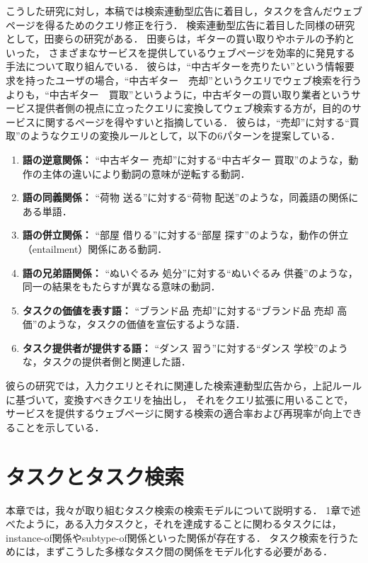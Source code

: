 \documentclass[submit,techreq]{ipsj}
\begin{document}
こうした研究に対し，本稿では検索連動型広告に着目し，タスクを含んだウェブページを得るためのクエリ修正を行う．
検索連動型広告に着目した同様の研究として，田麥らの研究がある\cite{tamugiDEIM}\cite{tamugiDBS}\cite{tamugiMS}．
田麥らは，ギターの買い取りやホテルの予約といった，
さまざまなサービスを提供しているウェブページを効率的に発見する手法について取り組んでいる．
彼らは，``中古ギターを売りたい''という情報要求を持ったユーザの場合，``中古ギター　売却''というクエリでウェブ検索を行うよりも，``中古ギター　買取''というように，中古ギターの買い取り業者というサービス提供者側の視点に立ったクエリに変換してウェブ検索する方が，目的のサービスに関するページを得やすいと指摘している．
彼らは，``売却''に対する``買取''のようなクエリの変換ルールとして，以下の6パターンを提案している．
\begin{enumerate}
\item \textbf{語の逆意関係：} ``中古ギター 売却''に対する``中古ギター 買取''のような，動作の主体の違いにより動詞の意味が逆転する動詞．
\item \textbf{語の同義関係：} ``荷物 送る''に対する``荷物 配送''のような，同義語の関係にある単語．
\item \textbf{語の併立関係：} ``部屋 借りる''に対する``部屋 探す''のような，動作の併立（entailment）関係にある動詞．
\item \textbf{語の兄弟語関係：} ``ぬいぐるみ 処分''に対する``ぬいぐるみ 供養''のような，同一の結果をもたらすが異なる意味の動詞．
\item \textbf{タスクの価値を表す語：} 
``ブランド品 売却''に対する``ブランド品 売却 高価''のような，タスクの価値を宣伝するような語．
\item \textbf{タスク提供者が提供する語：} ``ダンス 習う''に対する``ダンス 学校''のような，タスクの提供者側と関連した語．
\end{enumerate}
彼らの研究では，入力クエリとそれに関連した検索連動型広告から，上記ルールに基づいて，変換すべきクエリを抽出し，
それをクエリ拡張に用いることで，サービスを提供するウェブページに関する検索の適合率および再現率が向上できることを示している．

\section{タスクとタスク検索}
\label{sec:task}

本章では，我々が取り組むタスク検索の検索モデルについて説明する．
1章で述べたように，ある入力タスクと，それを達成することに関わるタスクには，
instance-of関係やsubtype-of関係といった関係が存在する．
タスク検索を行うためには，まずこうした多様なタスク間の関係をモデル化する必要がある．
\end{document}
